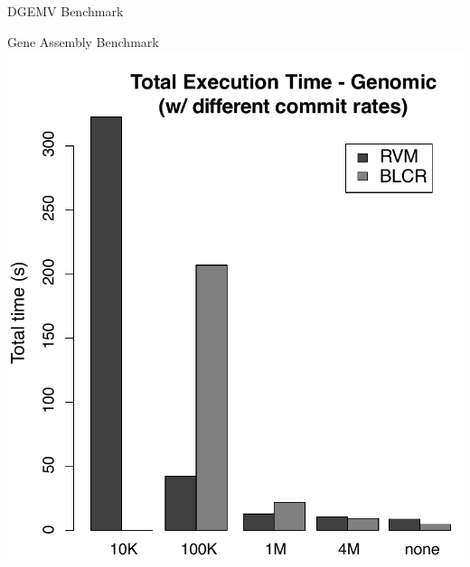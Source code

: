 \documentclass{beamer}
\begin{document}
\begin{frame}{DGEMV Benchmark}
\end{frame}

\begin{frame}{Gene Assembly Benchmark}
    \centering
    \includegraphics[scale=0.25]{genome_total_time_commit.pdf}
\end{frame}
\end{document}
